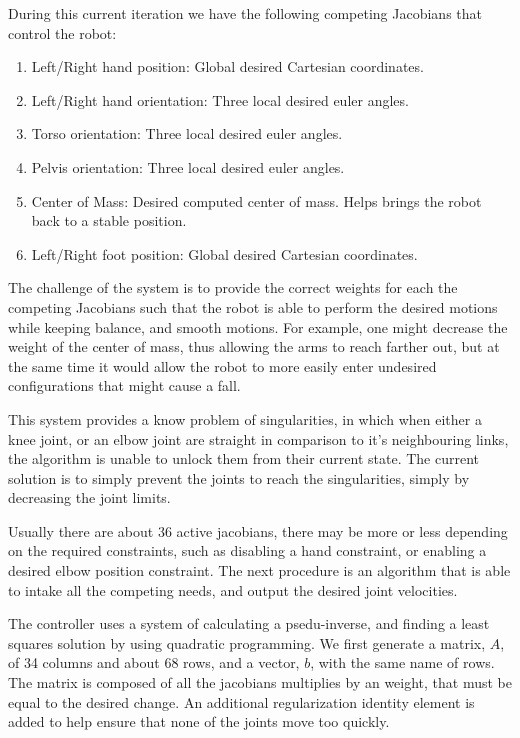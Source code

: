 \documentclass[12pt]{report}
\begin{document}
During this current iteration we have the following competing Jacobians that control the robot: 
\begin{enumerate}
\item Left/Right hand position: Global desired Cartesian coordinates.
\item Left/Right hand orientation: Three local desired euler angles.
\item Torso orientation: Three local desired euler angles.
\item Pelvis orientation: Three local desired euler angles.
\item Center of Mass: Desired computed center of mass. Helps brings the robot back to a stable position.
\item Left/Right foot position: Global desired Cartesian coordinates.
\end{enumerate}

The challenge of the system is to provide the correct weights for each the competing Jacobians such that the robot is able to perform the desired motions while keeping balance, and smooth motions. For example, one might decrease the weight of the center of mass, thus allowing the arms to reach farther out, but at the same time it would allow the robot to more easily enter undesired configurations that might cause a fall.

This system provides a know problem of singularities, in which when either a knee joint, or an elbow joint are straight in comparison to it's neighbouring links, the algorithm is unable to unlock them from their current state. The current solution is to simply prevent the joints to reach the singularities, simply by decreasing the joint limits. 

Usually there are about 36 active jacobians, there may be more or less depending on the required constraints, such as disabling a hand constraint, or enabling a desired elbow position constraint. The next procedure is an algorithm that is able to intake all the competing needs, and output the desired joint velocities. 

The controller uses a system of calculating a psedu-inverse, and finding a least squares solution by using quadratic programming. We first generate a matrix, $A$, of 34 columns and about 68 rows, and a vector, $b$, with the same name of rows. The matrix is composed of all the jacobians multiplies by an weight, that must be equal to the desired change. An additional regularization identity element is added to help ensure that none of the joints move too quickly. 
\end{document}

